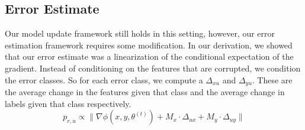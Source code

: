 \subsection{Error Estimate}
Our model update framework still holds in this setting, however, our error estimation framework requires some modification.
In our derivation, we showed that our error estimate was a linearization of the conditional expectation of the gradient.
Instead of conditioning on the features that are corrupted, we condition the error classes.
So for each error class, we compute a $\Delta_{xu}$ and $\Delta_{yu}$.
These are the average change in the features given that class and the average change in labels given that class respectively.
\[
p_{r,u}\propto\|\nabla\phi(x,y,\theta^{(t)}) + M_x \cdot \Delta_{ux} +  M_y \cdot \Delta_{uy}\|
\] 

